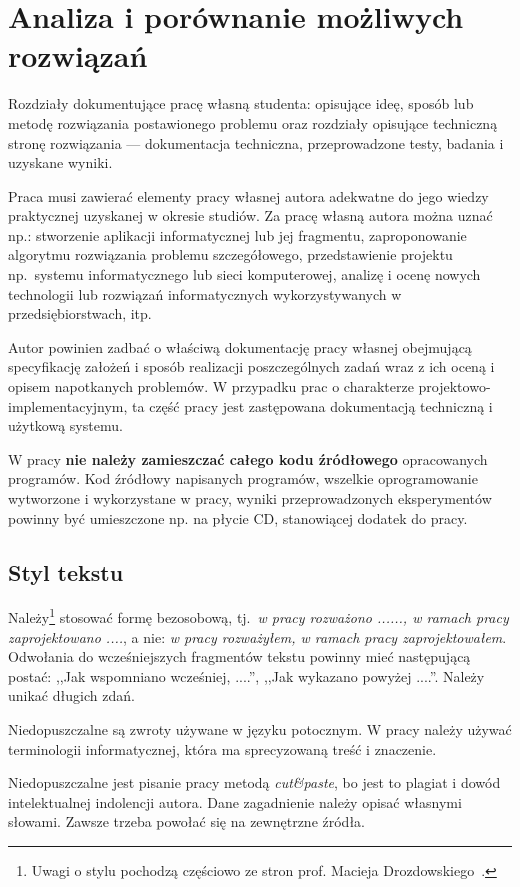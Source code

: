
\chapter{Analiza i porównanie możliwych rozwiązań}

Rozdziały dokumentujące pracę własną studenta: opisujące ideę, sposób lub metodę 
rozwiązania postawionego problemu oraz rozdziały opisujące techniczną stronę rozwiązania 
--- dokumentacja techniczna, przeprowadzone testy, badania i uzyskane wyniki. 

Praca musi zawierać elementy pracy własnej autora adekwatne do jego wiedzy praktycznej uzyskanej w
okresie studiów. Za pracę własną autora można uznać np.: stworzenie aplikacji informatycznej lub jej
fragmentu, zaproponowanie algorytmu rozwiązania problemu szczegółowego, przedstawienie projektu 
np.~systemu informatycznego lub sieci komputerowej, analizę i ocenę nowych technologii lub rozwiązań
informatycznych wykorzystywanych w przedsiębiorstwach, itp. 

Autor powinien zadbać o właściwą dokumentację pracy własnej obejmującą specyfikację założeń i 
sposób realizacji poszczególnych zadań
wraz z ich oceną i opisem napotkanych problemów. W przypadku prac o charakterze 
projektowo-implementacyjnym, ta część pracy jest zastępowana dokumentacją techniczną i użytkową systemu. 

W pracy \textbf{nie należy zamieszczać całego kodu źródłowego} opracowanych programów. Kod źródłowy napisanych
programów, wszelkie oprogramowanie wytworzone i wykorzystane w pracy, wyniki przeprowadzonych
eksperymentów powinny być umieszczone np. na płycie CD, stanowiącej dodatek do pracy.

\section*{Styl tekstu}

Należy\footnote{Uwagi o stylu pochodzą częściowo ze stron prof. Macieja Drozdowskiego~\cite{Drozdowski2006}.} 
stosować formę bezosobową, tj.~\emph{w pracy rozważono ......, 
w ramach pracy zaprojektowano ....}, a nie: \emph{w pracy rozważyłem, w ramach pracy zaprojektowałem}. 
Odwołania do wcześniejszych fragmentów tekstu powinny mieć następującą postać: ,,Jak wspomniano wcześniej, ....'', 
,,Jak wykazano powyżej ....''. Należy unikać długich zdań. 

Niedopuszczalne są zwroty używane w języku potocznym. W pracy należy używać terminologii informatycznej, która ma 
sprecyzowaną treść i znaczenie. 

Niedopuszczalne jest pisanie pracy metodą \emph{cut\&paste}, bo jest to plagiat i dowód intelektualnej indolencji autora.
Dane zagadnienie należy opisać własnymi słowami. Zawsze trzeba powołać się na zewnętrzne źródła. 

